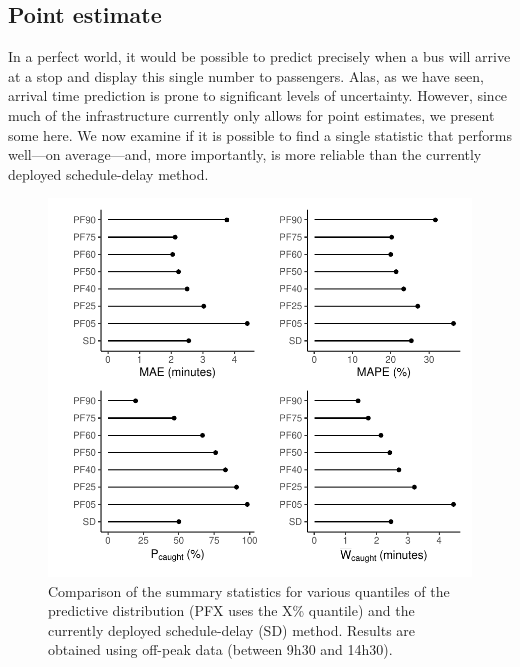 \subsection{Point estimate}
\label{sec:etas-point}

In a perfect world, it would be possible to predict precisely when a bus will arrive at a stop and display this single number to passengers. Alas, as we have seen, arrival time prediction is prone to significant levels of uncertainty. However, since much of the infrastructure currently only allows for point estimates, we present some here. We now examine if it is possible to find a single statistic that performs well---on average---and, more importantly, is more reliable than the currently deployed schedule-delay method.




\begin{knitrout}\small
{}\color{fgcolor}\begin{figure}

{\centering \includegraphics[width=.7\textwidth]{figure/eta_overall_results-1} 

}

\caption[Comparison of the summary statistics for various quantiles of the predictive distribution and the scheudle-delay method]{Comparison of the summary statistics for various quantiles of the predictive distribution (PFX uses the X\% quantile) and the currently deployed schedule-delay (SD) method. Results are obtained using off-peak data (between 9h30 and 14h30).}\label{fig:eta_overall_results}
\end{figure}


\end{knitrout}


